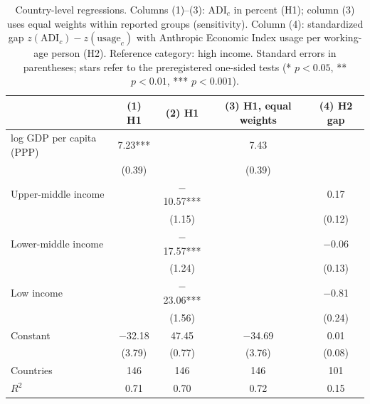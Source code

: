 \begin{table}[t]
\centering\small
\caption{Country-level regressions. Columns (1)--(3): $\mathrm{ADI}_c$ in percent (H1); column (3) uses equal weights within reported groups (sensitivity). Column (4): standardized gap $z(\mathrm{ADI}_c)-z(\text{usage}_c)$ with Anthropic Economic Index usage per working-age person (H2). Reference category: high income. Standard errors in parentheses; stars refer to the preregistered one-sided tests (* $p<0.05$, ** $p<0.01$, *** $p<0.001$).}
\label{tab:h1}
\begin{tabular}{lcccc}
\toprule
 & (1) H1 & (2) H1 & (3) H1, equal weights & (4) H2 gap \\
\midrule
log GDP per capita (PPP) & 7.23*** &  & 7.43 &  \\
 & (0.39) &  & (0.39) &  \\
Upper-middle income &  & $-$10.57*** &  & 0.17 \\
 &  & (1.15) &  & (0.12) \\
Lower-middle income &  & $-$17.57*** &  & $-$0.06 \\
 &  & (1.24) &  & (0.13) \\
Low income &  & $-$23.06*** &  & $-$0.81 \\
 &  & (1.56) &  & (0.24) \\
Constant & $-$32.18 & 47.45 & $-$34.69 & 0.01 \\
 & (3.79) & (0.77) & (3.76) & (0.08) \\
\midrule
Countries & 146 & 146 & 146 & 101 \\
$R^2$ & 0.71 & 0.70 & 0.72 & 0.15 \\
\bottomrule
\end{tabular}
\end{table}
